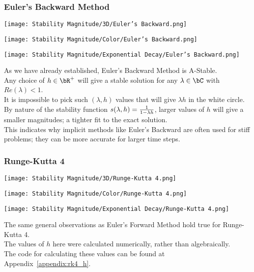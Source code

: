 \subsubsection{Euler's Backward Method}
\begin{multicols}{2}
	\begin{center}
	\texttt{[image: Stability Magnitude/3D/Euler's Backward.png]}
	\end{center}
	\columnbreak{}
	\begin{center}
	\texttt{[image: Stability Magnitude/Color/Euler's Backward.png]}
	\end{center}
\end{multicols}
\begin{multicols}{2}
	\begin{center}
		\texttt{[image: Stability Magnitude/Exponential Decay/Euler's Backward.png]}
	\end{center}
	\columnbreak{}
	As we have already established, Euler's Backward Method is A-Stable.\\
	Any choice of $h \in \bR^{+}$ will give a stable solution for any $\lambda \in \bC$ with $Re(\lambda) < 1$.\\
	It is impossible to pick such $(\lambda, h)$ values that will give $\lambda h$ in the white circle.\\
	By nature of the stability function $s(\lambda, h) = \frac{1}{1 - \lambda h}$, larger values of $h$ will give a smaller magnitudes; a tighter fit to the exact solution.\\
	This indicates why implicit methods like Euler's Backward are often used for stiff problems; they can be more accurate for larger time steps.\\
\end{multicols}

\subsubsection{Runge-Kutta 4}
\begin{multicols}{2}
	\begin{center}
	\texttt{[image: Stability Magnitude/3D/Runge-Kutta 4.png]}
	\end{center}
	\columnbreak{}
	\begin{center}
	\texttt{[image: Stability Magnitude/Color/Runge-Kutta 4.png]}
	\end{center}
\end{multicols}
\begin{multicols}{2}
	\begin{center}
		\texttt{[image: Stability Magnitude/Exponential Decay/Runge-Kutta 4.png]}
	\end{center}
	\columnbreak{}
	The same general observations as Euler's Forward Method hold true for Runge-Kutta 4.\\
	The values of $h$ here were calculated numerically, rather than algebraically.\\
	The code for calculating these values can be found at Appendix~\ref{appendix:rk4_h}.\\
\end{multicols}
